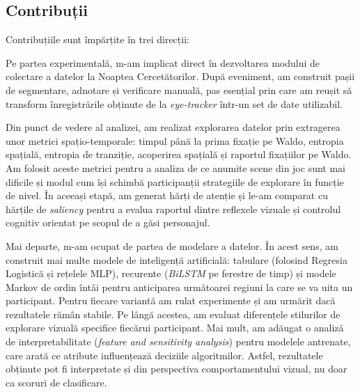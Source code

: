 \subsection{Contribuții}

Contribuțiile sunt împărțite în trei direcții:

Pe partea experimentală, m-am implicat direct în dezvoltarea modului de colectare a datelor la Noaptea Cercetătorilor. După eveniment, am construit pașii de segmentare, adnotare și verificare manuală, pas esențial prin care am reușit să transform înregistrările obținute de la \emph{eye-tracker} într-un set de date utilizabil.

Din punct de vedere al analizei, am realizat explorarea datelor prin extragerea unor metrici spațio-temporale: timpul până la prima fixație pe Waldo, entropia spațială, entropia de tranziție, acoperirea spațială și raportul fixațiilor pe Waldo. Am folosit aceste metrici pentru a analiza de ce anumite scene din joc sunt mai dificile și modul cum își schimbă participanții strategiile de explorare în funcție de nivel. În aceeași etapă, am generat hărți de atenție și le-am comparat cu hărțile de \emph{saliency} pentru a evalua raportul dintre reflexele vizuale și controlul cognitiv orientat pe scopul de a găsi personajul. 

Mai departe, m-am ocupat de partea de modelare a datelor. În acest sens, am construit mai multe modele de inteligență artificială: tabulare (folosind Regresia Logistică și rețelele MLP), recurente (\emph{BiLSTM} pe ferestre de timp) și modele Markov de ordin întâi pentru anticiparea următoarei regiuni la care se va uita un participant. Pentru fiecare variantă am rulat experimente și am urmărit dacă rezultatele rămân stabile. Pe lângă acestea, am evaluat diferențele stilurilor de explorare vizuală specifice fiecărui participant. Mai mult, am adăugat o analiză de interpretabilitate (\emph{feature and sensitivity analysis}) pentru modelele antrenate, care arată ce atribute influențează deciziile algoritmilor. Astfel, rezultatele obținute pot fi interpretate și din perspectiva comportamentului vizual, nu doar ca scoruri de clasificare.